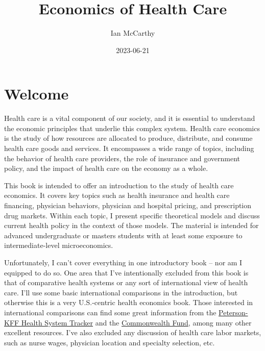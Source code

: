 \documentclass[
  letterpaper,
  DIV=11,
  numbers=noendperiod]{scrreport}
\title{Economics of Health Care}
\author{Ian McCarthy}
\date{2023-06-21}
\renewcommand*\contentsname{Table of contents}
\newcommand\contentsname{Table of contents}
\theoremstyle{definition}
\theoremstyle{remark}
\begin{document}
\maketitle
\ifdefined\Shaded\renewenvironment{Shaded}{\begin{tcolorbox}[sharp corners, enhanced, frame hidden, interior hidden, boxrule=0pt, breakable, borderline west={3pt}{0pt}{shadecolor}]}{\end{tcolorbox}}\fi

\renewcommand*\contentsname{Table of contents}
{
\hypersetup{linkcolor=}
\setcounter{tocdepth}{2}
\tableofcontents
}

\hypertarget{welcome}{%
\chapter*{Welcome}\label{welcome}}


Health care is a vital component of our society, and it is essential to
understand the economic principles that underlie this complex system.
Health care economics is the study of how resources are allocated to
produce, distribute, and consume health care goods and services. It
encompasses a wide range of topics, including the behavior of health
care providers, the role of insurance and government policy, and the
impact of health care on the economy as a whole.

This book is intended to offer an introduction to the study of health
care economics. It covers key topics such as health insurance and health
care financing, physician behaviors, physician and hospital pricing, and
prescription drug markets. Within each topic, I present specific
theoretical models and discuss current health policy in the context of
those models. The material is intended for advanced undergraduate or
masters students with at least some exposure to intermediate-level
microeconomics.

Unfortunately, I can't cover everything in one introductory book -- nor
am I equipped to do so. One area that I've intentionally excluded from
this book is that of comparative health systems or any sort of
international view of health care. I'll use some basic international
comparisons in the introduction, but otherwise this is a very
U.S.-centric health economics book. Those interested in international
comparisons can find some great information from the
\href{https://www.healthsystemtracker.org/}{Peterson-KFF Health System
Tracker} and the
\href{https://www.commonwealthfund.org/international-health-policy-center/system-profiles}{Commonwealth
Fund}, among many other excellent resources. I've also excluded any
discussion of health care labor markets, such as nurse wages, physician
location and specialty selection, etc.
\end{document}
